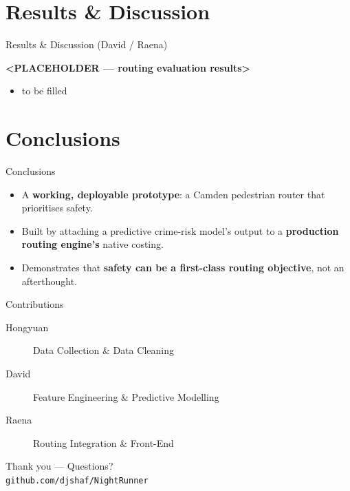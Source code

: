 \documentclass{beamer}
\begin{document}
\section{Results \& Discussion}

\begin{frame}{Results \& Discussion \hfill \small(David / Raena)}
  \begin{center}
    \textbf{<PLACEHOLDER --- routing evaluation results>}
  \end{center}
  \begin{itemize}
  \item to be filled
  \end{itemize}
\end{frame}

\section{Conclusions}

\begin{frame}{Conclusions}
  \begin{itemize}
    \item A \textbf{working, deployable prototype}: a Camden pedestrian router that prioritises safety.
    \item Built by attaching a predictive crime-risk model's output to a \textbf{production routing engine's} native costing.
    \item Demonstrates that \textbf{safety can be a first-class routing objective}, not an afterthought.
  \end{itemize}
  \vspace{0.6em}
\begin{block}{Contributions}
  \begin{description}
    \item[Hongyuan] Data Collection \& Data Cleaning
    \item[David] Feature Engineering \& Predictive Modelling
    \item[Raena] Routing Integration \& Front-End
\end{description}
\end{block}
\end{frame}

\begin{frame}{}
  \centering
  \Large Thank you --- Questions?\\
  \vspace{0.5em}
  \normalsize \texttt{github.com/djshaf/NightRunner}
\end{frame}
\end{document}
